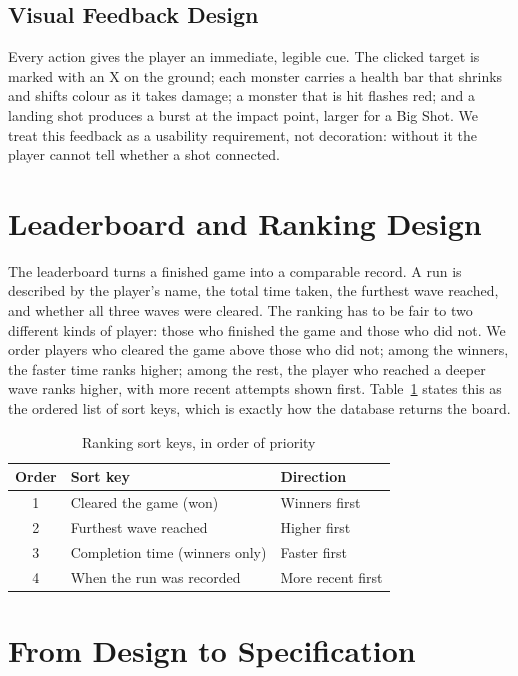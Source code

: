 \documentclass[12pt,a4paper]{report}
\begin{document}
\subsection{Visual Feedback Design}

Every action gives the player an immediate, legible cue. The clicked target is
marked with an X on the ground; each monster carries a health bar that shrinks
and shifts colour as it takes damage; a monster that is hit flashes red; and a
landing shot produces a burst at the impact point, larger for a Big Shot. We
treat this feedback as a usability requirement, not decoration: without it the
player cannot tell whether a shot connected.

\section{Leaderboard and Ranking Design}

The leaderboard turns a finished game into a comparable record. A run is
described by the player's name, the total time taken, the furthest wave reached,
and whether all three waves were cleared. The ranking has to be fair to two
different kinds of player: those who finished the game and those who did not. We
order players who cleared the game above those who did not; among the winners,
the faster time ranks higher; among the rest, the player who reached a deeper
wave ranks higher, with more recent attempts shown first. Table~\ref{tab:rank}
states this as the ordered list of sort keys, which is exactly how the database
returns the board.

\begin{table}[htbp]
\centering
\caption{Ranking sort keys, in order of priority}
\label{tab:rank}
\begin{tabular}{|c|p{6.0cm}|p{3.2cm}|}
\hline
Order & Sort key & Direction \\
\hline
1 & Cleared the game (won) & Winners first \\
\hline
2 & Furthest wave reached & Higher first \\
\hline
3 & Completion time (winners only) & Faster first \\
\hline
4 & When the run was recorded & More recent first \\
\hline
\end{tabular}
\end{table}

\section{From Design to Specification}
\end{document}
